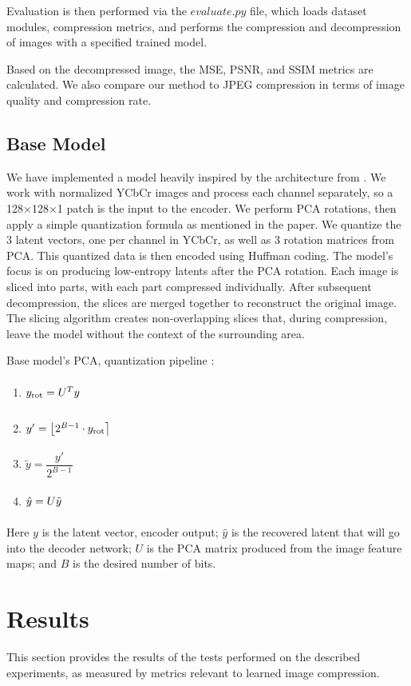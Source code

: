 \documentclass[conference]{IEEEtran}
\begin{document}
Evaluation is then performed via the $evaluate.py$ file, which loads dataset modules, compression metrics, and performs the compression and decompression of images with a specified trained model. 

Based on the decompressed image, the MSE, PSNR, and SSIM metrics are calculated. We also compare our method to JPEG compression in terms of image quality and compression rate.

\subsection{Base Model}

We have implemented a model heavily inspired by the architecture from \cite{cheng_deep_2018}. We work with normalized YCbCr images and process each channel separately, so a 128×128×1 patch is the input to the encoder. We perform PCA rotations, then apply a simple quantization formula as mentioned in the paper. We quantize the 3 latent vectors, one per channel in YCbCr, as well as 3 rotation matrices from PCA. This quantized data is then encoded using Huffman coding. The model's focus is on producing low-entropy latents after the PCA rotation.
Each image is sliced into parts, with each part compressed individually. After subsequent decompression, the slices are merged together to reconstruct the original image. The slicing algorithm creates non-overlapping slices that, during compression, leave the model without the context of the surrounding area.

Base model's PCA, quantization pipeline \cite{cheng_deep_2018}:

\begin{enumerate}
    \item \hfill $\vphantom{\dfrac{y'}{2^{B-1}}} y_{\mathrm{rot}} = U^T y$ \hfill\null
    \item \hfill $\vphantom{\dfrac{y'}{2^{B-1}}} y' = \left\lfloor 2^{B-1} \cdot y_{\mathrm{rot}} \right\rceil$ \hfill\null
    \item \hfill $\tilde{y} = \dfrac{y'}{2^{B-1}}$ \hfill\null
    \item \hfill $\vphantom{\dfrac{y'}{2^{B-1}}} \hat{y} = U\tilde{y}$ \hfill\null
\end{enumerate}
Here $y$ is the latent vector, encoder output; $\hat{y}$ is the recovered latent that will go into the decoder network; $U$ is the PCA matrix produced from the image feature maps; and $B$ is the desired number of bits.


\section{Results}
This section provides the results of the tests performed on the described experiments, as measured by metrics relevant to learned image compression.
\end{document}
